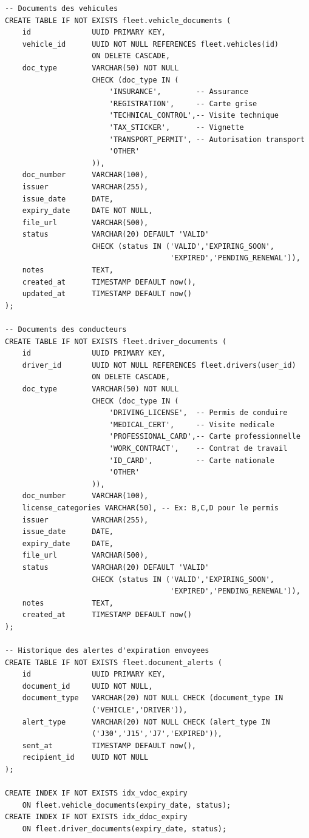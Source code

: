 \documentclass[12pt,a4paper]{report}
\begin{document}
\begin{lstlisting}[style=sqlStyle, caption={Tables du module Documents}]
-- Documents des vehicules
CREATE TABLE IF NOT EXISTS fleet.vehicle_documents (
    id              UUID PRIMARY KEY,
    vehicle_id      UUID NOT NULL REFERENCES fleet.vehicles(id)
                    ON DELETE CASCADE,
    doc_type        VARCHAR(50) NOT NULL
                    CHECK (doc_type IN (
                        'INSURANCE',        -- Assurance
                        'REGISTRATION',     -- Carte grise
                        'TECHNICAL_CONTROL',-- Visite technique
                        'TAX_STICKER',      -- Vignette
                        'TRANSPORT_PERMIT', -- Autorisation transport
                        'OTHER'
                    )),
    doc_number      VARCHAR(100),
    issuer          VARCHAR(255),
    issue_date      DATE,
    expiry_date     DATE NOT NULL,
    file_url        VARCHAR(500),
    status          VARCHAR(20) DEFAULT 'VALID'
                    CHECK (status IN ('VALID','EXPIRING_SOON',
                                      'EXPIRED','PENDING_RENEWAL')),
    notes           TEXT,
    created_at      TIMESTAMP DEFAULT now(),
    updated_at      TIMESTAMP DEFAULT now()
);

-- Documents des conducteurs
CREATE TABLE IF NOT EXISTS fleet.driver_documents (
    id              UUID PRIMARY KEY,
    driver_id       UUID NOT NULL REFERENCES fleet.drivers(user_id)
                    ON DELETE CASCADE,
    doc_type        VARCHAR(50) NOT NULL
                    CHECK (doc_type IN (
                        'DRIVING_LICENSE',  -- Permis de conduire
                        'MEDICAL_CERT',     -- Visite medicale
                        'PROFESSIONAL_CARD',-- Carte professionnelle
                        'WORK_CONTRACT',    -- Contrat de travail
                        'ID_CARD',          -- Carte nationale
                        'OTHER'
                    )),
    doc_number      VARCHAR(100),
    license_categories VARCHAR(50), -- Ex: B,C,D pour le permis
    issuer          VARCHAR(255),
    issue_date      DATE,
    expiry_date     DATE,
    file_url        VARCHAR(500),
    status          VARCHAR(20) DEFAULT 'VALID'
                    CHECK (status IN ('VALID','EXPIRING_SOON',
                                      'EXPIRED','PENDING_RENEWAL')),
    notes           TEXT,
    created_at      TIMESTAMP DEFAULT now()
);

-- Historique des alertes d'expiration envoyees
CREATE TABLE IF NOT EXISTS fleet.document_alerts (
    id              UUID PRIMARY KEY,
    document_id     UUID NOT NULL,
    document_type   VARCHAR(20) NOT NULL CHECK (document_type IN
                    ('VEHICLE','DRIVER')),
    alert_type      VARCHAR(20) NOT NULL CHECK (alert_type IN
                    ('J30','J15','J7','EXPIRED')),
    sent_at         TIMESTAMP DEFAULT now(),
    recipient_id    UUID NOT NULL
);

CREATE INDEX IF NOT EXISTS idx_vdoc_expiry
    ON fleet.vehicle_documents(expiry_date, status);
CREATE INDEX IF NOT EXISTS idx_ddoc_expiry
    ON fleet.driver_documents(expiry_date, status);
\end{lstlisting}
\end{document}
